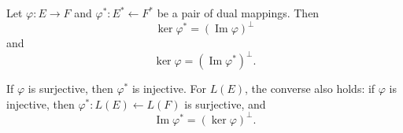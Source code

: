 Let $\varphi: E \to F$ and $\varphi^*: E^* \leftarrow F^*$ be a pair of dual mappings. Then
$$\ker \varphi^* = (\operatorname{Im} \varphi)^\perp$$
and
$$\ker \varphi = (\operatorname{Im} \varphi^*)^\perp.$$

If $\varphi$ is surjective, then $\varphi^*$ is injective. For $L(E)$, the converse also holds: if $\varphi$ is injective, then $\varphi^*: L(E) \leftarrow L(F)$ is surjective, and
$$\operatorname{Im} \varphi^* = (\ker \varphi)^\perp.$$
